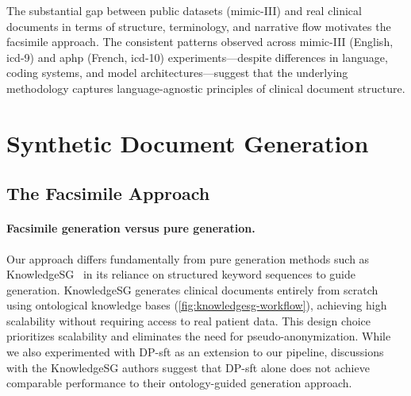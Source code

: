 The substantial gap between public datasets (\gls{mimic}-III) and real clinical documents in terms of structure, terminology, and narrative flow motivates the facsimile approach.
The consistent patterns observed across \gls{mimic}-III (English, \gls{icd}-9) and \gls{aphp} (French, \gls{icd}-10) experiments—despite differences in language, coding systems, and model architectures—suggest that the underlying methodology captures language-agnostic principles of clinical document structure.

\section{Synthetic Document Generation}

\subsection{The Facsimile Approach}

\paragraph{Facsimile generation versus pure generation.}

Our approach differs fundamentally from pure generation methods such as KnowledgeSG~\cite{wangKnowledgeSGPrivacyPreservingSynthetic2024} in its reliance on structured keyword sequences to guide generation.
KnowledgeSG generates clinical documents entirely from scratch using ontological knowledge bases (\autoref{fig:knowledgesg-workflow}), achieving high scalability without requiring access to real patient data.
This design choice prioritizes scalability and eliminates the need for pseudo-anonymization.
While we also experimented with DP-\gls{sft} as an extension to our pipeline, discussions with the KnowledgeSG authors suggest that DP-\gls{sft} alone does not achieve comparable performance to their ontology-guided generation approach.

